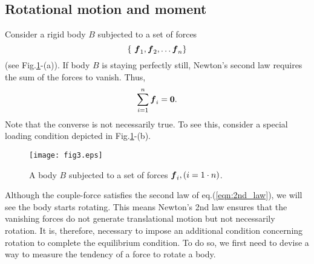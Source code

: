 \documentclass[10pt,a4j]{article}
\begin{document}
\subsection{Rotational motion and moment}
Consider a rigid body $B$ subjected to a set of forces
\[ 
	\left\{\ \fat{f}_1, \fat{f}_2, \dots \fat{f}_{n} \right\}
\]
(see Fig.\ref{fig:fig3}-(a)).
If body $B$ is staying perfectly still, 
Newton's second law requires the sum of the forces to vanish.
Thus,
\begin{equation}
	\sum_{i=1}^n \mbox{\boldmath $f$}_i = \mbox{\boldmath $0$}.
	\label{eqn:2nd_law}
\end{equation}
Note that the converse is not necessarily true.
To see this, consider a special loading condition depicted in Fig.\ref{fig:fig3}-(b). 
\begin{figure}[h]
	\begin{center}
	\texttt{[image: fig3.eps]} 
	\end{center}
	\caption{A body $B$ subjected to a set of forces $\mbox{\boldmath $f$}_i,(i=1\cdot n)$.} 
	\label{fig:fig3}
\end{figure}
Although the couple-force satisfies the second law of eq.(\ref{eqn:2nd_law}), we will see the body starts rotating. 
This means Newton's 2nd law ensures that the vanishing forces do not generate translational 
motion but not necessarily rotation. It is, therefore, necessary to impose an additional 
condition concerning rotation to complete the equilibrium condition. 
To do so, we first need to devise a way to measure the tendency of a force to rotate a body.
\end{document}
